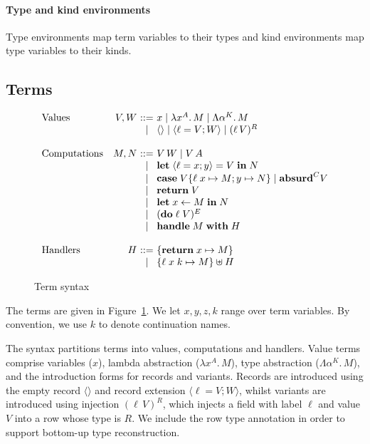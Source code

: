 \documentclass[12pt,mscres,cdtppar,twoside,openright,logo,rightchapter,normalheadings]{infthesis}
\makeatletter
\theoremstyle{definition}
\newcommand{\slab}[1]{\textrm{#1}}
\newcommand{\revto}{\ensuremath{\leftarrow}}
\newcommand{\keyw}[1]{\textbf{#1}}
\newcommand{\Handle}{\keyw{handle}}
\newcommand{\With}{\keyw{with}}
\newcommand{\Let}{\keyw{let}}
\newcommand{\In}{\keyw{in}}
\newcommand{\Do}{\keyw{do}}
\newcommand{\Return}{\keyw{return}}
\newcommand{\Case}{\keyw{case}}
\newcommand{\Absurd}{\keyw{absurd}}
\newcommand{\Record}[1]{\ensuremath{\langle #1 \rangle}}
\newcommand{\ba}{\begin{array}}
\newcommand{\ea}{\end{array}}
\newenvironment{syntax}{\[\ba{@{}l@{\quad}r@{~}c@{~}l@{}}}{\ea\]\ignorespacesafterend}
\makeatother
\begin{document}
\paragraph{Type and kind environments}
Type environments map term variables to their types and kind
environments map type variables to their kinds.

\subsection{Terms}
\begin{figure}
\begin{syntax}
\slab{Values}        &V,W  &::= & x
                             \mid \lambda x^A .\, M \mid \Lambda \alpha^K .\, M  \\
                     &     &\mid& \Record{} \mid \Record{\ell = V;W} \mid (\ell\, V)^R \\
                     &     &    &\\
\slab{Computations}  &M,N  &::= & V\,W \mid V\,A\\
                     &     &\mid& \Let\; \Record{\ell=x;y} = V \; \In \; N\\
                     &     &\mid& \Case\; V \{\ell\; x \mapsto M; y \mapsto N\} \mid \Absurd^C V\\
                     &     &\mid& \Return\; V \\
                     &     &\mid& \Let \; x \revto M \; \In \; N\\
                     &     &\mid& (\Do \; \ell \; V)^E \\
                     &     &\mid& \Handle \; M \; \With \; H\\
                     &     &    &\\
\slab{Handlers}      &H    &::= & \{ \Return \; x \mapsto M \} \\
                     &     &\mid& \{ \ell \; x \; k \mapsto M \} \uplus H \\
\end{syntax}

\caption{Term syntax}
\label{fig:term-syntax}
\end{figure}
The terms are given in Figure~\ref{fig:term-syntax}. We let $x,y,z,k$
range over term variables. By convention, we use $k$ to denote
continuation names.

The syntax partitions terms into values, computations and
handlers. 
%
Value terms comprise variables ($x$), lambda abstraction
($\lambda x^A . \, M$), type abstraction ($\Lambda \alpha^K . \, M$),
and the introduction forms for records and variants. Records are
introduced using the empty record $\Record{}$ and record extension
$\Record{\ell = V; W}$, whilst variants are introduced using injection
$(\ell\, V)^R$, which injects a field with label $\ell$ and value $V$
into a row whose type is $R$. We include the row type annotation in
order to support bottom-up type reconstruction.
\end{document}
